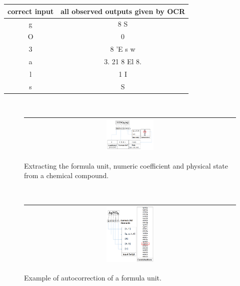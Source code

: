\documentclass[conference]{IEEEtran}
\begin{document}
\begin{table}
\begin{center}
 \begin{tabular}{|| c | c ||}
 \hline
 correct input & all observed outputs given by OCR\\
 \hline
 g & 8 S\\
 \hline
O & 0\\
\hline
3 & 8 'E s w \\
\hline
a & 3. 21 8 El 8. \\
\hline
l & 1 I\\
\hline
s & S\\
 \hline
 \end{tabular}
 \end{center}
 \label{table:errorTable}
 \end{table}

\begin{figure}[h]
\center\ 
\begin{tabular}{|c|} 
\hline
\includegraphics[width=0.23\textwidth]{stateCorrection.png}\\
\hline
\end{tabular} 
\caption{Extracting the formula unit, numeric coefficient and physical state from a chemical compound. }
\label{stateCorrection} 
\end{figure} 

\begin{figure}[h]
\center\ 
\begin{tabular}{|c|} 
\hline
\includegraphics[width=0.23\textwidth]{autoCorrectionPictorial.png}\\
\hline
\end{tabular} 
\caption{Example of autocorrection of a formula unit. }
\label{autoCorrection} 
\end{figure} 

 
\end{document}

